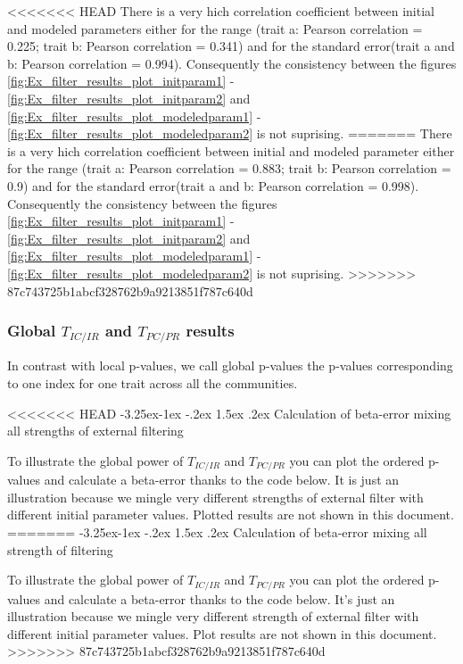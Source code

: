 \documentclass[12pt]{article}\usepackage[]{graphicx}\usepackage[]{color}
\makeatletter
\newcounter {subsubsubsection}[subsubsection]
\newcommand\subsubsubsection{\@startsection{subsubsubsection}{4}{\z@}%
          {-3.25ex\@plus -1ex \@minus -.2ex}%
          {1.5ex \@plus .2ex}%
          {\normalfont\normalsize\bfseries}}
\makeatother
\begin{document}
\begin{landscape}
\begin{table}[ht]
{\begin{table}[ht]
{\begin{table}[ht]
{<<<<<<< HEAD
There is a very hich correlation coefficient between initial and modeled parameters either for the range (trait a: Pearson correlation = 0.225; trait b: Pearson correlation = 0.341) and for the standard error(trait a and b: Pearson correlation = 0.994). Consequently the consistency between the figures \ref{fig:Ex_filter_results_plot_initparam1} - \ref{fig:Ex_filter_results_plot_initparam2} and \ref{fig:Ex_filter_results_plot_modeledparam1} - \ref{fig:Ex_filter_results_plot_modeledparam2} is not suprising. 
=======
There is a very hich correlation coefficient between initial and modeled parameter either for the range (trait a: Pearson correlation = 0.883; trait b: Pearson correlation = 0.9) and for the standard error(trait a and b: Pearson correlation = 0.998). Consequently the consistency between the figures \ref{fig:Ex_filter_results_plot_initparam1} - \ref{fig:Ex_filter_results_plot_initparam2} and \ref{fig:Ex_filter_results_plot_modeledparam1} - \ref{fig:Ex_filter_results_plot_modeledparam2} is not suprising. 
>>>>>>> 87c743725b1abcf328762b9a9213851f787c640d
 
 \subsubsection {Global $T_{IC/IR}$ and $T_{PC/PR}$ results}
 
In contrast with local p-values, we call global p-values the p-values corresponding to one index for one trait across all the communities. 
 
<<<<<<< HEAD
  \subsubsubsection {Calculation of beta-error mixing all strengths of external filtering}
 
To illustrate the global power of $T_{IC/IR}$ and $T_{PC/PR}$ you can plot the ordered p-values and calculate a beta-error thanks to the code below. It is just an illustration because we mingle very different strengths of external filter with different initial parameter values. Plotted results are not shown in this document. 
=======
  \subsubsubsection {Calculation of beta-error mixing all strength of filtering}
 
To illustrate the global power of $T_{IC/IR}$ and $T_{PC/PR}$ you can plot the ordered p-values and calculate a beta-error thanks to the code below. It's just an illustration because we mingle very different strength of external filter with different initial parameter values. Plot results are not shown in this document. 
>>>>>>> 87c743725b1abcf328762b9a9213851f787c640d
 
}
\end{table}}
\end{table}}
\end{table}
\end{landscape}
\end{document}
